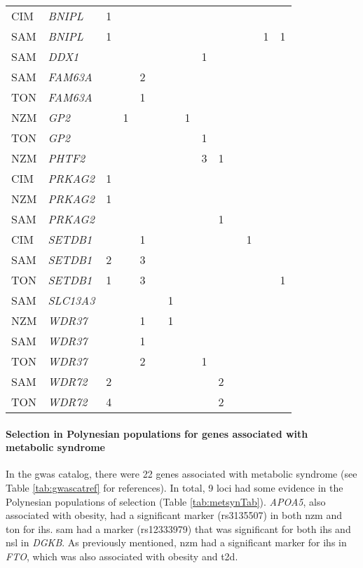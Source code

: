 \documentclass[twoside,openright]{report}
\let\oldparagraph\paragraph
\renewcommand{\paragraph}[1]{\oldparagraph{#1}\mbox{}}
\begin{document}
\begin{ThreePartTable}
\begin{longtable}[t]{llllllllllllll}
CIM & \em{BNIPL} & 1 &  &  &  &  &  &  &  &  &  &  & \\
SAM & \em{BNIPL} & 1 &  &  &  &  &  &  &  &  &  & 1 & 1\\
SAM & \em{DDX1} &  &  &  &  &  &  & 1 &  &  &  &  & \\
\addlinespace
SAM & \em{FAM63A} &  &  & 2 &  &  &  &  &  &  &  &  & \\
TON & \em{FAM63A} &  &  & 1 &  &  &  &  &  &  &  &  & \\
NZM & \em{GP2} &  & 1 &  &  &  & 1 &  &  &  &  &  & \\
TON & \em{GP2} &  &  &  &  &  &  & 1 &  &  &  &  & \\
NZM & \em{PHTF2} &  &  &  &  &  &  & 3 & 1 &  &  &  & \\
\addlinespace
CIM & \em{PRKAG2} & 1 &  &  &  &  &  &  &  &  &  &  & \\
NZM & \em{PRKAG2} & 1 &  &  &  &  &  &  &  &  &  &  & \\
SAM & \em{PRKAG2} &  &  &  &  &  &  &  & 1 &  &  &  & \\
CIM & \em{SETDB1} &  &  & 1 &  &  &  &  &  &  & 1 &  & \\
SAM & \em{SETDB1} & 2 &  & 3 &  &  &  &  &  &  &  &  & \\
\addlinespace
TON & \em{SETDB1} & 1 &  & 3 &  &  &  &  &  &  &  &  & 1\\
SAM & \em{SLC13A3} &  &  &  &  & 1 &  &  &  &  &  &  & \\
NZM & \em{WDR37} &  &  & 1 &  & 1 &  &  &  &  &  &  & \\
SAM & \em{WDR37} &  &  & 1 &  &  &  &  &  &  &  &  & \\
TON & \em{WDR37} &  &  & 2 &  &  &  & 1 &  &  &  &  & \\
\addlinespace
SAM & \em{WDR72} & 2 &  &  &  &  &  &  & 2 &  &  &  & \\
TON & \em{WDR72} & 4 &  &  &  &  &  &  & 2 &  &  &  & \\*
\end{longtable}
\end{ThreePartTable}

\endgroup{}

\paragraph{Selection in Polynesian populations for genes associated with
metabolic
syndrome}\label{selection-in-polynesian-populations-for-genes-associated-with-metabolic-syndrome}

In the \gls{gwas} catalog, there were 22 genes associated with metabolic
syndrome (see Table \ref{tab:gwascatref} for references). In total, 9
loci had some evidence in the Polynesian populations of selection (Table
\ref{tab:metsynTab}). \emph{APOA5}, also associated with obesity, had a
significant marker (rs3135507) in both \gls{nzm} and \gls{ton} for
\gls{ihs}. \Gls{sam} had a marker (rs12333979) that was significant for
both \gls{ihs} and \gls{nsl} in \emph{DGKB}. As previously mentioned,
\gls{nzm} had a significant marker for \gls{ihs} in \emph{FTO}, which
was also associated with obesity and \gls{t2d}.
\end{document}
